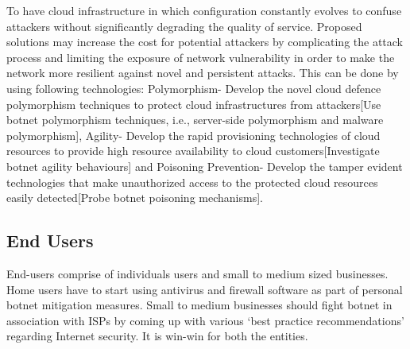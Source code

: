 To have cloud infrastructure in which configuration constantly evolves to confuse attackers without significantly degrading the quality of service. Proposed solutions may increase the cost for potential attackers by complicating the attack process and limiting the exposure of network vulnerability in order to make the network more resilient against novel and persistent attacks. This can be done by using following technologies: Polymorphism- Develop the novel cloud defence polymorphism techniques to protect cloud infrastructures from attackers[Use botnet polymorphism techniques, i.e., server-side polymorphism and malware polymorphism], Agility- Develop the rapid provisioning technologies of cloud resources to provide high resource availability to cloud customers[Investigate botnet agility behaviours] and Poisoning Prevention- Develop the tamper evident technologies that make unauthorized access to the protected cloud resources easily detected[Probe botnet poisoning mechanisms].

\subsection{End Users}

End-users comprise of individuals users and small to medium sized businesses. Home users have to start using antivirus and firewall software as part of personal botnet mitigation measures. Small to medium businesses should fight botnet in association with ISPs by coming up with various ‘best practice recommendations’ regarding Internet security. It is win-win for both the entities.


